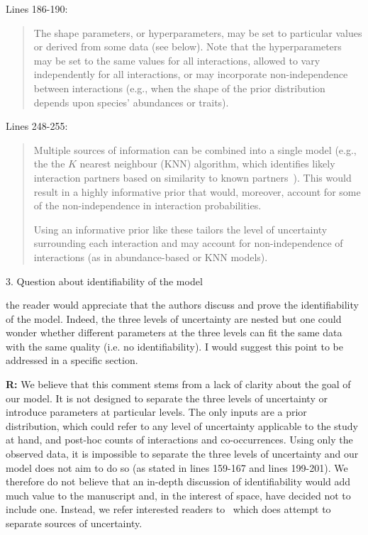 \documentclass[12pt]{letter}
\newenvironment{refquote}{\bigskip \begin{it}}{\end{it}\smallskip}
\begin{document}
		Lines 186-190:


		\begin{quotation}
		    The shape parameters, or hyperparameters, may be set to particular values or derived from some data (see below). Note that the hyperparameters may be set to the same values for all interactions, allowed to vary independently for all interactions, or may incorporate non-independence between interactions (e.g., when the shape of the prior distribution depends upon species' abundances or traits).
		\end{quotation}


		Lines 248-255:


		\begin{quotation}
			Multiple sources of information can be combined into a single model (e.g., the the $K$ nearest neighbour (KNN) algorithm, which identifies likely interaction partners based on similarity to known partners~\citep{DesjardinsProulx}). This would result in a highly informative prior that would, moreover, account for some of the non-independence in interaction probabilities. 


	        Using an informative prior like these tailors the level of uncertainty surrounding each interaction and may account for non-independence of interactions (as in abundance-based or KNN models).
	    \end{quotation}


	3. Question about identifiability of the model

		\begin{refquote}

			the reader would appreciate that the authors discuss and prove the identifiability of the model. Indeed, the three levels of uncertainty are nested but one could wonder whether different parameters at the three levels can fit the same data with the same quality (i.e. no identifiability).  I would suggest this point to be addressed in a specific section.

		\end{refquote}


		\textbf{R:} We believe that this comment stems from a lack of clarity about the goal of our model. It is not designed to separate the three levels of uncertainty or introduce parameters at particular levels. The only inputs are a prior distribution, which could refer to any level of uncertainty applicable to the study at hand, and post-hoc counts of interactions and co-occurrences. Using only the observed data, it is impossible to separate the three levels of uncertainty and our model does not aim to do so (as stated in lines 159-167 and lines 199-201). We therefore do not believe that an in-depth discussion of identifiability would add much value to the manuscript and, in the interest of space, have decided not to include one. Instead, we refer interested readers to~\citet{Weinstein2017} which does attempt to separate sources of uncertainty.
\end{document}
